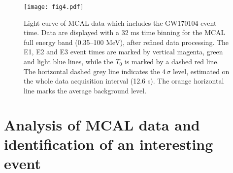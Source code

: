 \documentclass[preprint2]{aastex}
\def\gw {GW170104 }
\begin{document}
\begin{figure*}
    \centerline{\texttt{[image: fig4.pdf]}}
    \caption{Light curve of MCAL data which includes the \gw event time. Data are displayed with a 32 ms time binning for the MCAL full energy band (0.35--100 MeV), after refined data processing.
The E1, E2 and E3 event times are marked by vertical magenta, green and light blue lines, while the $T_0$ is marked by a dashed red line.
The horizontal dashed grey line indicates the 4\,$\sigma$ level, estimated on the whole
data acquisition interval (12.6 s). The orange horizontal line marks the average background level.
    }
 \label{fig-4}
\end{figure*}


\section{Analysis of MCAL data and identification of an interesting event}
\end{document}
